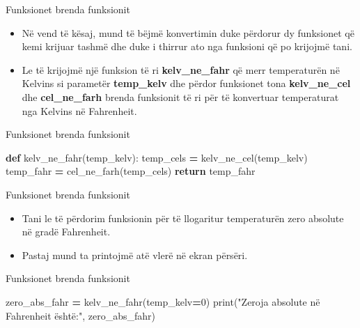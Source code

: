 \documentclass[
  ignorenonframetext,
]{beamer}
\newenvironment{Shaded}{\begin{snugshade}}{\end{snugshade}}
\newcommand{\BuiltInTok}[1]{#1}
\newcommand{\ControlFlowTok}[1]{\textcolor[rgb]{0.13,0.29,0.53}{\textbf{#1}}}
\newcommand{\DecValTok}[1]{\textcolor[rgb]{0.00,0.00,0.81}{#1}}
\newcommand{\KeywordTok}[1]{\textcolor[rgb]{0.13,0.29,0.53}{\textbf{#1}}}
\newcommand{\NormalTok}[1]{#1}
\newcommand{\OperatorTok}[1]{\textcolor[rgb]{0.81,0.36,0.00}{\textbf{#1}}}
\newcommand{\StringTok}[1]{\textcolor[rgb]{0.31,0.60,0.02}{#1}}
\begin{document}
\begin{frame}{Funksionet brenda funksionit}
\protect\hypertarget{funksionet-brenda-funksionit-1}{}
\begin{itemize}
\item
  Në vend të kësaj, mund të bëjmë konvertimin duke përdorur dy
  funksionet që kemi krijuar tashmë dhe duke i thirrur ato nga funksioni
  që po krijojmë tani.
\item
  Le të krijojmë një funksion të ri \textbf{kelv\_ne\_fahr} që merr
  temperaturën në Kelvins si parametër \textbf{temp\_kelv} dhe përdor
  funksionet tona \textbf{kelv\_ne\_cel} dhe \textbf{cel\_ne\_farh}
  brenda funksionit të ri për të konvertuar temperaturat nga Kelvins në
  Fahrenheit.
\end{itemize}
\end{frame}

\begin{frame}[fragile]{Funksionet brenda funksionit}
\protect\hypertarget{funksionet-brenda-funksionit-2}{}
\begin{Shaded}
\begin{Highlighting}[]
\KeywordTok{def}\NormalTok{ kelv\_ne\_fahr(temp\_kelv):}
\NormalTok{    temp\_cels }\OperatorTok{=}\NormalTok{ kelv\_ne\_cel(temp\_kelv)}
\NormalTok{    temp\_fahr }\OperatorTok{=}\NormalTok{ cel\_ne\_farh(temp\_cels)}
    \ControlFlowTok{return}\NormalTok{ temp\_fahr}
\end{Highlighting}
\end{Shaded}
\end{frame}

\begin{frame}{Funksionet brenda funksionit}
\protect\hypertarget{funksionet-brenda-funksionit-3}{}
\begin{itemize}
\item
  Tani le të përdorim funksionin për të llogaritur temperaturën zero
  absolute në gradë Fahrenheit.
\item
  Pastaj mund ta printojmë atë vlerë në ekran përsëri.
\end{itemize}
\end{frame}

\begin{frame}[fragile]{Funksionet brenda funksionit}
\protect\hypertarget{funksionet-brenda-funksionit-4}{}
\begin{Shaded}
\begin{Highlighting}[]
\NormalTok{zero\_abs\_fahr }\OperatorTok{=}\NormalTok{ kelv\_ne\_fahr(temp\_kelv}\OperatorTok{=}\DecValTok{0}\NormalTok{)}
\BuiltInTok{print}\NormalTok{(}\StringTok{"Zeroja absolute në Fahrenheit është:"}\NormalTok{, zero\_abs\_fahr)}
\end{Highlighting}
\end{Shaded}
\end{frame}
\end{document}

